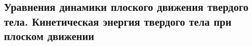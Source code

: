 \subsection{\textbf{Уравнения динамики плоского движения твердого тела.} Кинетическая энергия твердого тела при плоском движении}
